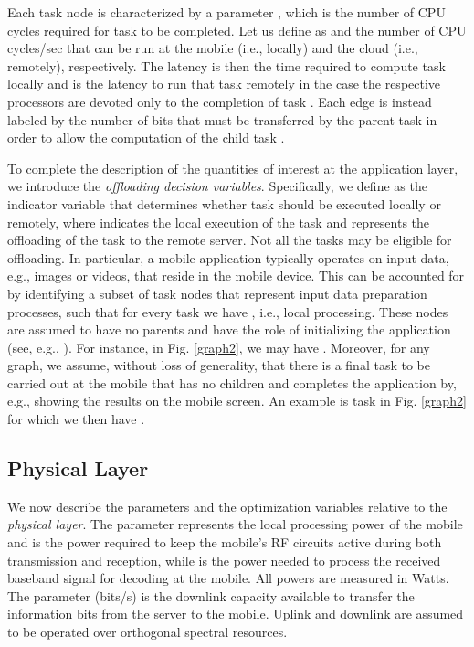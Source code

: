 \documentclass[journal,twocolumn,10pt,twoside]{IEEEtranTCOM}
\theoremstyle{plain}
\theoremstyle{plain}
\theoremstyle{remark}
\begin{document}
Each task node  is characterized by a parameter , which is the number of CPU cycles required for task  to be completed. Let us define as  and  the number of CPU cycles/sec that can be run at the mobile (i.e., locally) and the cloud (i.e., remotely), respectively. The latency   is then the time required to compute task  locally and  is the latency to run that task remotely in the case the respective processors are devoted only to the completion of task . Each edge  is instead labeled by the number of bits  that must be transferred by the parent task  in order to allow the computation of the child task .



To complete the description of the quantities of interest at the application layer, we introduce the \textit{offloading decision variables}. Specifically, we define  as the indicator variable that determines whether task  should be executed locally or remotely, where  indicates the local execution of the task and  represents the offloading of the task to the remote server. Not all the tasks may be eligible for offloading. In particular, a mobile application typically operates on input data, e.g., images or videos, that reside in the mobile device. This can be accounted for by identifying a subset  of task nodes that represent input data preparation processes, such that for every task  we have , i.e., local processing. These nodes are assumed to have no parents and have the role of initializing the application (see, e.g., \cite{no}\cite{hermp}). For instance, in Fig. \ref{graph2}, we may have . Moreover, for any graph, we assume, without loss of generality, that there is a final task to be carried out at the mobile that has no children and completes the application by, e.g., showing the results on the mobile screen. An example is task  in Fig. \ref{graph2} for which we then have .


\subsection{Physical Layer}
\label{sec:intro:phy}
We now describe the parameters and the optimization variables relative to the \textit{physical layer}. The parameter  represents the local processing power of the mobile and  is the power required to keep the mobile's RF circuits active during both transmission and reception, while  is the power needed to process the received baseband signal for decoding at the mobile. All powers are measured in Watts. The parameter  (bits/s) is the downlink capacity available to transfer the information bits from the server to the mobile. Uplink and downlink are assumed to be operated over orthogonal spectral resources.
\end{document}
